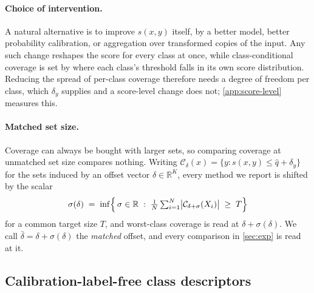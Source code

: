 \paragraph{Choice of intervention.} A natural alternative is to improve $s(x,y)$ itself, by a
better model, better probability calibration, or aggregation over transformed copies of the
input. Any such change reshapes the score for every class at once, while class-conditional
coverage is set by where each class's threshold falls in its own score distribution. Reducing
the spread of per-class coverage therefore needs a degree of freedom per class, which
$\delta_y$ supplies and a score-level change does not; \cref{app:score-level} measures this.

\paragraph{Matched set size.} Coverage can always be bought with larger sets, so comparing
coverage at unmatched set size compares nothing. Writing
$\mathcal{C}_\delta(x)=\{y: s(x,y)\le \hat q+\delta_y\}$ for the sets induced by an offset
vector $\delta\in\mathbb{R}^{K}$, every method we report is shifted by the scalar
\begin{equation}
\sigma(\delta) \;=\;
\inf\Bigl\{\,\sigma\in\mathbb{R} \;:\;
\tfrac{1}{N}\textstyle\sum_{i=1}^{N}\bigl|\mathcal{C}_{\delta+\sigma}(X_i)\bigr| \;\ge\; T \Bigr\}
\label{eq:sigma}
\end{equation}
for a common target size $T$, and worst-class coverage is read at $\delta+\sigma(\delta)$. We
call $\bar\delta = \delta + \sigma(\delta)$ the \emph{matched} offset, and every
comparison in \cref{sec:exp} is read at it.

\subsection{Calibration-label-free class descriptors}
\label{sec:phi}

